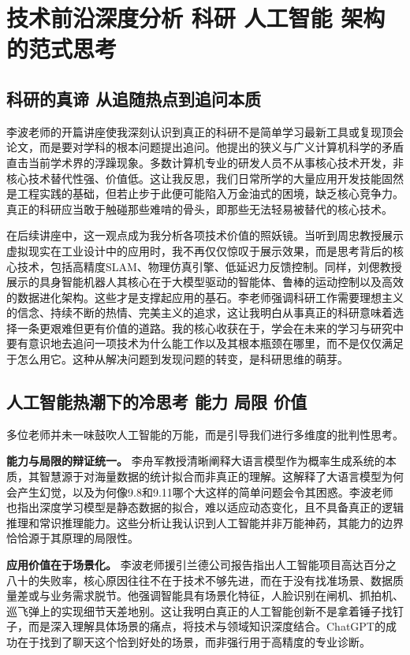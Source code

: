 \chapter{技术前沿深度分析 科研 人工智能 架构的范式思考}

\section{科研的真谛 从追随热点到追问本质}

李波老师的开篇讲座使我深刻认识到真正的科研不是简单学习最新工具或复现顶会论文，而是要对学科的根本问题提出追问。他提出的狭义与广义计算机科学的矛盾直击当前学术界的浮躁现象。多数计算机专业的研发人员不从事核心技术开发，非核心技术替代性强、价值低。这让我反思，我们日常所学的大量应用开发技能固然是工程实践的基础，但若止步于此便可能陷入万金油式的困境，缺乏核心竞争力。真正的科研应当敢于触碰那些难啃的骨头，即那些无法轻易被替代的核心技术。

在后续讲座中，这一观点成为我分析各项技术价值的照妖镜。当听到周忠教授展示虚拟现实在工业设计中的应用时，我不再仅仅惊叹于展示效果，而是思考背后的核心技术，包括高精度SLAM、物理仿真引擎、低延迟力反馈控制。同样，刘偲教授展示的具身智能机器人其核心在于大模型驱动的智能体、鲁棒的运动控制以及高效的数据进化架构。这些才是支撑起应用的基石。李老师强调科研工作需要理想主义的信念、持续不断的热情、完美主义的追求，这让我明白从事真正的科研意味着选择一条更艰难但更有价值的道路。我的核心收获在于，学会在未来的学习与研究中要有意识地去追问一项技术为什么能工作以及其根本瓶颈在哪里，而不是仅仅满足于怎么用它。这种从解决问题到发现问题的转变，是科研思维的萌芽。

\section{人工智能热潮下的冷思考 能力 局限 价值}

多位老师并未一味鼓吹人工智能的万能，而是引导我们进行多维度的批判性思考。

\textbf{能力与局限的辩证统一。} 李舟军教授清晰阐释大语言模型作为概率生成系统的本质，其智慧源于对海量数据的统计拟合而非真正的理解。这解释了大语言模型为何会产生幻觉，以及为何像9.8和9.11哪个大这样的简单问题会令其困惑。李波老师也指出深度学习模型是静态数据的拟合，难以适应动态变化，且不具备真正的逻辑推理和常识推理能力。这些分析让我认识到人工智能并非万能神药，其能力的边界恰恰源于其原理的局限性。

\textbf{应用价值在于场景化。} 李波老师援引兰德公司报告指出人工智能项目高达百分之八十的失败率，核心原因往往不在于技术不够先进，而在于没有找准场景、数据质量差或与业务需求脱节。他强调智能具有场景化特征，人脸识别在闸机、抓拍机、巡飞弹上的实现细节天差地别。这让我明白真正的人工智能创新不是拿着锤子找钉子，而是深入理解具体场景的痛点，将技术与领域知识深度结合。ChatGPT的成功在于找到了聊天这个恰到好处的场景，而非强行用于高精度的专业诊断。

